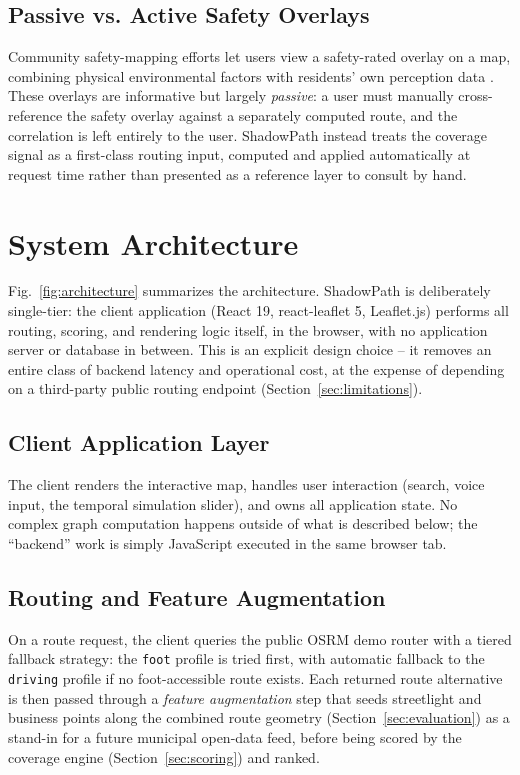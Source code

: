 \documentclass[conference]{IEEEtran}
\begin{document}
\subsection{Passive vs. Active Safety Overlays}
Community safety-mapping efforts let users view a safety-rated overlay on a map, combining physical environmental factors with residents' own perception data \cite{gargiulo2020}. These overlays are informative but largely \emph{passive}: a user must manually cross-reference the safety overlay against a separately computed route, and the correlation is left entirely to the user. ShadowPath instead treats the coverage signal as a first-class routing input, computed and applied automatically at request time rather than presented as a reference layer to consult by hand.

\section{System Architecture}
\label{sec:architecture}

Fig.~\ref{fig:architecture} summarizes the architecture. ShadowPath is deliberately single-tier: the client application (React 19, react-leaflet 5, Leaflet.js) performs all routing, scoring, and rendering logic itself, in the browser, with no application server or database in between. This is an explicit design choice -- it removes an entire class of backend latency and operational cost, at the expense of depending on a third-party public routing endpoint (Section~\ref{sec:limitations}).

\subsection{Client Application Layer}
The client renders the interactive map, handles user interaction (search, voice input, the temporal simulation slider), and owns all application state. No complex graph computation happens outside of what is described below; the ``backend'' work is simply JavaScript executed in the same browser tab.

\subsection{Routing and Feature Augmentation}
On a route request, the client queries the public OSRM demo router with a tiered fallback strategy: the \texttt{foot} profile is tried first, with automatic fallback to the \texttt{driving} profile if no foot-accessible route exists. Each returned route alternative is then passed through a \emph{feature augmentation} step that seeds streetlight and business points along the combined route geometry (Section~\ref{sec:evaluation}) as a stand-in for a future municipal open-data feed, before being scored by the coverage engine (Section~\ref{sec:scoring}) and ranked.
\end{document}
